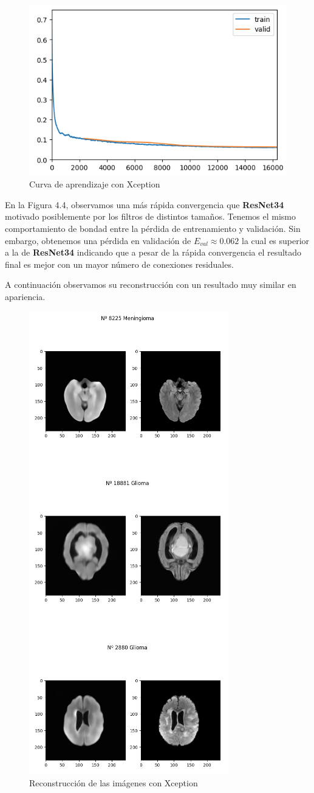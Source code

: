 \begin{figure}[H]
	\centering
	\includegraphics[width=0.7\linewidth]{imagenes/curva_xception.png}
	\caption{Curva de aprendizaje con Xception}
\end{figure}

En la Figura 4.4, observamos una más rápida convergencia que \textbf{ResNet34} motivado posiblemente por los filtros de distintos tamaños. Tenemos el mismo comportamiento de bondad entre la pérdida de entrenamiento y validación. Sin embargo, obtenemos una pérdida en validación de $E_{val} \approx 0.062$ la cual es superior a la de \textbf{ResNet34} indicando que a pesar de la rápida convergencia el resultado final es mejor con un mayor número de conexiones residuales. 

A continuación observamos su reconstrucción con un resultado muy similar en apariencia.
\begin{figure}[H]
	\centering
	\includegraphics[width=0.4\linewidth]{imagenes/reconstruccion_xception.png}
	\caption{Reconstrucción de las imágenes con Xception}
\end{figure}

